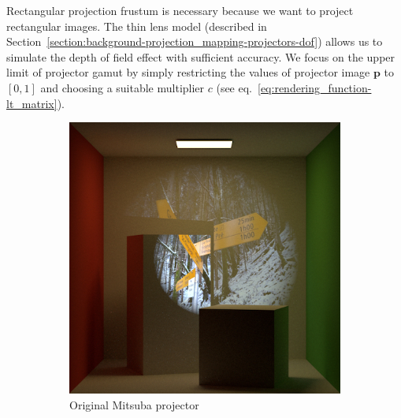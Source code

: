 Rectangular projection frustum is necessary because we want to project rectangular images. The thin lens model (described in Section~\ref{section:background-projection_mapping-projectors-dof}) allows us to simulate the depth of field effect with sufficient accuracy. We focus on the upper limit of projector gamut by simply restricting the values of projector image \(\bm{p}\) to \([0, 1]\) and choosing a suitable multiplier \(c\) (see eq.~\ref{eq:rendering_function-lt_matrix}).

\begin{figure}[]
    \centering
    \begin{subfigure}[b]{0.32\textwidth}
        \centering
        \includegraphics[width=\textwidth]{images/03-projector_features-spotlight.jpg}
        \caption{Original Mitsuba projector}
        \label{fig:methods_projector_features_spotlight}
    \end{subfigure}
    \hfill
    \begin{subfigure}[b]{0.32\textwidth}
        \centering

\end{subfigure}
\end{figure}

